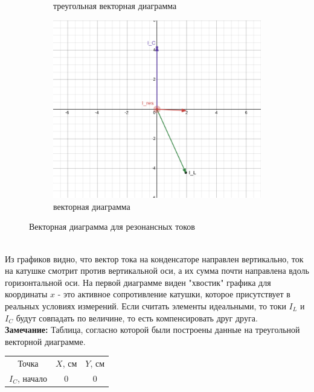 \documentclass[a4paper, 12pt]{article}
\begin{document}
\begin{enumerate}
\begin{figure}[htbp]
\begin{subfigure}{0.45\textwidth}
            \caption{треугольная векторная диаграмма}
            \label{треугольная векторная диаграмма}
        \end{subfigure}
        \begin{subfigure}{0.45\textwidth}
            \includegraphics[width=\linewidth]{vec.png}
            \caption{векторная диаграмма}
            \label{векторная диаграмма}
        \end{subfigure}
        \caption{Векторная диаграмма для резонансных токов}
    \end{figure}\\
    Из графиков видно, что вектор тока на конденсаторе направлен вертикально, ток на катушке смотрит против вертикальной оси, а их сумма
    почти направлена вдоль горизонтальной оси. На первой диаграмме виден "хвостик" графика для координаты $x$ - это активное сопротивление катушки,
    которое присутствует в реальных условиях измерений. Если считать элементы идеальными, то токи $I_{L}$ и $I_{C}$ будут совпадать по величине, то есть компенсировать друг друга.\\
    \textbf{Замечание:} Таблица, согласно которой были построены данные на треугольной векторной диаграмме.
    \begin{table}[htbp]
        \centering
        \begin{tabular}{|c|c|c|}
            \hline
            Точка & $X$, см & $Y$, см\\
            $I_{C}$, начало & 0 & 0\\

\end{tabular}
\end{table}
\end{enumerate}
\end{document}
